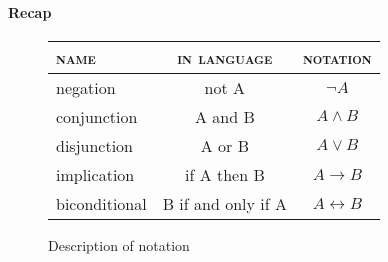 \paragraph{Recap}

\begin{figure}[H]
  \centering
  \begin{tabular}{lcc}
    \textsc{name} & \textsc{in language} & \textsc{notation} \\\hline
    negation & not A & $\lnot A$ \\ \hline
    conjunction & A and B & $A \land B$ \\ \hline
    disjunction & A or B & $A \lor B$ \\ \hline
    implication & if A then B & $A \to B$ \\ \hline
    biconditional & B if and only if A & $A \leftrightarrow B$ \\ \hline

  \end{tabular}
  \caption{Description of notation}
  \label{fig:propositional}
\end{figure}







